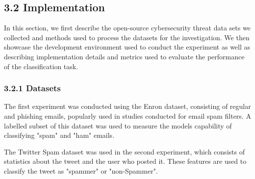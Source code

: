 \documentclass[letterpaper,twocolumn,fleqn]{article}
\begin{document}
\subsection{3.2 Implementation}
In this section, we first describe the open-source cybersecurity threat data sets we collected and methods used to process the datasets for the investigation. We then showcase the development environment used to conduct the experiment as well as describing implementation details and metrics used to evaluate the performance of the classification task. 

\subsubsection{3.2.1 Datasets}
The first experiment was conducted using the Enron dataset, consisting of regular and phishing emails, popularly used in studies conducted for email spam filters. A labelled subset of this dataset was used to measure the models capability of classifying "spam" and "ham" emails. 

The Twitter Spam dataset was used in the second experiment, which consists of statistics about the tweet and the user who posted it. These features are used to classify the tweet as "spammer" or "non-Spammer".
\end{document}
